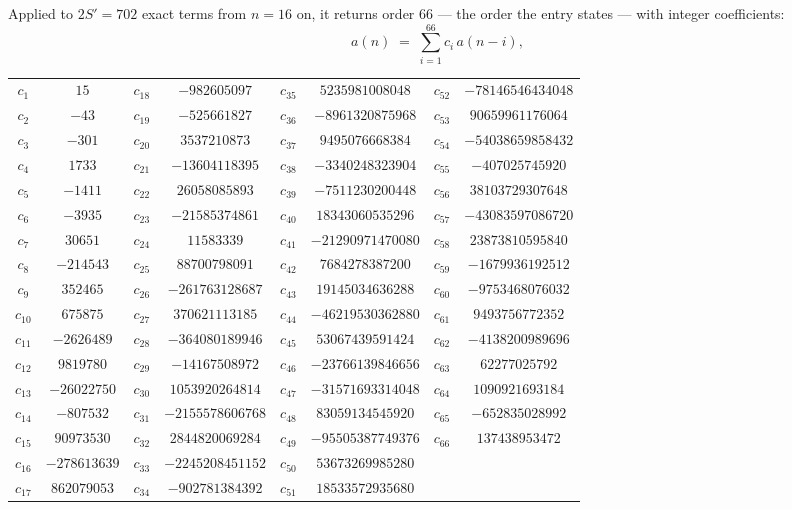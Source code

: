 \documentclass[11pt,a4paper]{article}
\theoremstyle{plain}
\theoremstyle{definition}
\begin{document}
Applied to $2S'=702$ exact terms from $n=16$ on, it returns order $66$ --- the
order the entry states --- with integer coefficients:
\[
a(n)\;=\;\sum_{i=1}^{66}c_i\,a(n-i),
\]
\begin{center}\small
\begin{tabular}{cccccccc}
$c_{1}$ & $15$ & $c_{18}$ & $-982605097$ & $c_{35}$ & $5235981008048$ & $c_{52}$ & $-78146546434048$ \\
$c_{2}$ & $-43$ & $c_{19}$ & $-525661827$ & $c_{36}$ & $-8961320875968$ & $c_{53}$ & $90659961176064$ \\
$c_{3}$ & $-301$ & $c_{20}$ & $3537210873$ & $c_{37}$ & $9495076668384$ & $c_{54}$ & $-54038659858432$ \\
$c_{4}$ & $1733$ & $c_{21}$ & $-13604118395$ & $c_{38}$ & $-3340248323904$ & $c_{55}$ & $-407025745920$ \\
$c_{5}$ & $-1411$ & $c_{22}$ & $26058085893$ & $c_{39}$ & $-7511230200448$ & $c_{56}$ & $38103729307648$ \\
$c_{6}$ & $-3935$ & $c_{23}$ & $-21585374861$ & $c_{40}$ & $18343060535296$ & $c_{57}$ & $-43083597086720$ \\
$c_{7}$ & $30651$ & $c_{24}$ & $11583339$ & $c_{41}$ & $-21290971470080$ & $c_{58}$ & $23873810595840$ \\
$c_{8}$ & $-214543$ & $c_{25}$ & $88700798091$ & $c_{42}$ & $7684278387200$ & $c_{59}$ & $-1679936192512$ \\
$c_{9}$ & $352465$ & $c_{26}$ & $-261763128687$ & $c_{43}$ & $19145034636288$ & $c_{60}$ & $-9753468076032$ \\
$c_{10}$ & $675875$ & $c_{27}$ & $370621113185$ & $c_{44}$ & $-46219530362880$ & $c_{61}$ & $9493756772352$ \\
$c_{11}$ & $-2626489$ & $c_{28}$ & $-364080189946$ & $c_{45}$ & $53067439591424$ & $c_{62}$ & $-4138200989696$ \\
$c_{12}$ & $9819780$ & $c_{29}$ & $-14167508972$ & $c_{46}$ & $-23766139846656$ & $c_{63}$ & $62277025792$ \\
$c_{13}$ & $-26022750$ & $c_{30}$ & $1053920264814$ & $c_{47}$ & $-31571693314048$ & $c_{64}$ & $1090921693184$ \\
$c_{14}$ & $-807532$ & $c_{31}$ & $-2155578606768$ & $c_{48}$ & $83059134545920$ & $c_{65}$ & $-652835028992$ \\
$c_{15}$ & $90973530$ & $c_{32}$ & $2844820069284$ & $c_{49}$ & $-95505387749376$ & $c_{66}$ & $137438953472$ \\
$c_{16}$ & $-278613639$ & $c_{33}$ & $-2245208451152$ & $c_{50}$ & $53673269985280$ &  &  \\
$c_{17}$ & $862079053$ & $c_{34}$ & $-902781384392$ & $c_{51}$ & $18533572935680$ &  &  \\
\end{tabular}
\end{center}
\end{document}
